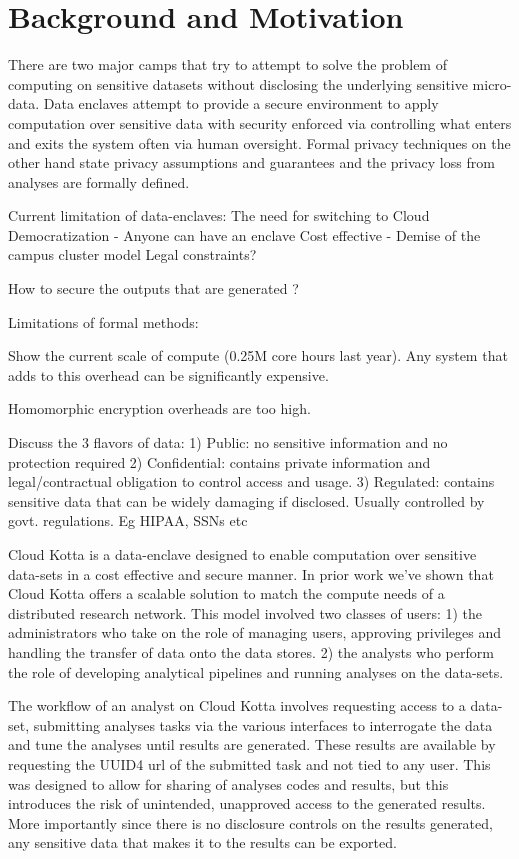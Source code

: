 \section{Background and Motivation} \label{sec:background}

There are two major camps that try to attempt to solve the problem of computing on sensitive
datasets without disclosing the underlying sensitive micro-data. Data enclaves attempt to
provide a secure environment to apply computation over sensitive data with security enforced
via controlling what enters and exits the system often via human oversight. Formal privacy
techniques on the other hand state privacy assumptions and guarantees and the privacy loss
from analyses are formally defined.


Current limitation of data-enclaves:
The need for switching to Cloud
      Democratization - Anyone can have an enclave
      Cost effective - Demise of the campus cluster model
      Legal constraints?

 How to secure the outputs that are generated ?

 Limitations of formal methods:

 Show the current scale of compute (0.25M core hours last year). Any system that adds to this overhead can
 be significantly expensive.

 Homomorphic encryption overheads are too high.


 Discuss the 3 flavors of data:
 1) Public: no sensitive information and no protection required
 2) Confidential: contains private information and legal/contractual obligation to control access and usage.
 3) Regulated: contains sensitive data that can be widely damaging if disclosed. Usually controlled by govt.
    regulations. Eg HIPAA, SSNs etc


Cloud Kotta is a data-enclave designed to enable computation over sensitive data-sets
in a cost effective and secure manner. In prior work we've shown that Cloud Kotta offers
a scalable solution to match the compute needs of a distributed research network.
This model involved two classes of users: 1) the administrators who take on the role of managing
users, approving privileges and handling the transfer of data onto the data stores. 2) the analysts
who perform the role of developing analytical pipelines and running analyses on the data-sets.

The workflow of an analyst on Cloud Kotta involves requesting access to a data-set, submitting analyses
tasks via the various interfaces to interrogate the data and tune the analyses until results are generated.
These results are available by requesting the UUID4 url of the submitted task and not tied to any user.
This was designed to allow for sharing of analyses codes and results, but this introduces the risk
of unintended, unapproved access to the generated results. More importantly since there is no disclosure
controls on the results generated, any sensitive data that makes it to the results can be exported.

